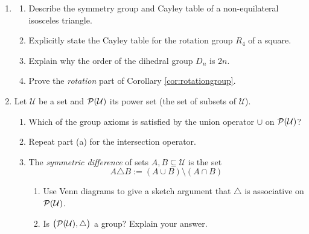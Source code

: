 \begin{exercises}
\begin{enumerate}
  \item\begin{enumerate}\itemsep2pt
    \item Describe the symmetry group and Cayley table of a non-equilateral isosceles triangle.
    \item\label{exs:squarerot} Explicitly state the Cayley table for the rotation group $R_4$ of a square.
    \item Explain why the order of the dihedral group $D_n$ is $2n$.
    \item Prove the \emph{rotation} part of Corollary \ref{cor:rotationgroup}.
  \end{enumerate}
	
	
  


  \item Let $\mathcal U$ be a set and $\mathcal{P}(\mathcal U)$ its power set (the set of subsets of $\mathcal U$).
  \begin{enumerate}\itemsep2pt
    \item Which of the group axioms is satisfied by the union operator $\cup$ on $\mathcal{P}(\mathcal U)$?
    \item Repeat part (a) for the intersection operator.
    \item The \emph{symmetric difference} of sets $A,B\subseteq\mathcal U$ is the set
    \[A\triangle B:=(A\cup B)\setminus(A\cap B)\]
    \begin{enumerate}
      \item Use Venn diagrams to give a sketch argument that $\triangle$ is associative on $\mathcal{P}(\mathcal U)$.
      \item Is $\bigl(\mathcal{P}(\mathcal U),\triangle\bigr)$ a group? Explain your answer.
  	\end{enumerate}
  \end{enumerate}
  

\end{enumerate}
\end{exercises}
